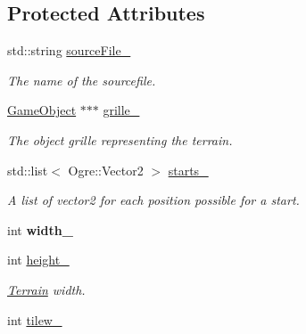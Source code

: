 \subsection*{Protected Attributes}
\begin{DoxyCompactItemize}
\item 
std\+::string \hyperlink{class_terrain_ae286556f7fb77345a4a3fbc6901edf4e}{source\+File\+\_\+}\hypertarget{class_terrain_ae286556f7fb77345a4a3fbc6901edf4e}{}\label{class_terrain_ae286556f7fb77345a4a3fbc6901edf4e}

\begin{DoxyCompactList}\small\item\em The name of the sourcefile. \end{DoxyCompactList}\item 
\hyperlink{class_game_object}{Game\+Object} $\ast$$\ast$$\ast$ \hyperlink{class_terrain_a5cf02f28fd2d993a6b7417cc46dc9855}{grille\+\_\+}\hypertarget{class_terrain_a5cf02f28fd2d993a6b7417cc46dc9855}{}\label{class_terrain_a5cf02f28fd2d993a6b7417cc46dc9855}

\begin{DoxyCompactList}\small\item\em The object grille representing the terrain. \end{DoxyCompactList}\item 
std\+::list$<$ Ogre\+::\+Vector2 $>$ \hyperlink{class_terrain_a271c49a8e30c106cc1bbf547513f1923}{starts\+\_\+}\hypertarget{class_terrain_a271c49a8e30c106cc1bbf547513f1923}{}\label{class_terrain_a271c49a8e30c106cc1bbf547513f1923}

\begin{DoxyCompactList}\small\item\em A list of vector2 for each position possible for a start. \end{DoxyCompactList}\item 
int {\bfseries width\+\_\+}\hypertarget{class_terrain_ab92044760ae9c7429d120e152a29b0d4}{}\label{class_terrain_ab92044760ae9c7429d120e152a29b0d4}

\item 
int \hyperlink{class_terrain_ab2307840dabffc4f01b346508717e51a}{height\+\_\+}\hypertarget{class_terrain_ab2307840dabffc4f01b346508717e51a}{}\label{class_terrain_ab2307840dabffc4f01b346508717e51a}

\begin{DoxyCompactList}\small\item\em \hyperlink{class_terrain}{Terrain} width. \end{DoxyCompactList}\item 
int \hyperlink{class_terrain_a18bf07b70f49ed1099817698ea94479a}{tilew\+\_\+}\hypertarget{class_terrain_a18bf07b70f49ed1099817698ea94479a}{}\label{class_terrain_a18bf07b70f49ed1099817698ea94479a}


\end{DoxyCompactItemize}
